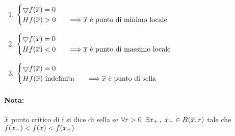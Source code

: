 \documentclass[12pt]{article}
\begin{document}
\begin{enumerate}
    \item $
              \begin{cases}
                  \bigtriangledown f(\overline{x}) = 0                                             \\
                  Hf(\overline{x}) > 0 & \quad\Longrightarrow \overline{x} \text{ è punto di minimo locale}
              \end{cases}
          $
    \item $
              \begin{cases}
                  \bigtriangledown f(\overline{x}) = 0                                              \\
                  Hf(\overline{x}) < 0 & \quad\Longrightarrow \overline{x} \text{ è punto di massimo locale}
              \end{cases}
          $
    \item $
              \begin{cases}
                  \bigtriangledown f(\overline{x}) = 0                                                    \\
                  Hf(\overline{x}) \text{ indefinita} & \quad\Longrightarrow \overline{x} \text{ è punto di sella}
              \end{cases}
          $
\end{enumerate}

\paragraph*{Nota:}
$\overline{x}$ punto critico di f si dice di sella se $\forall r > 0\;\; \exists x_+\,,\; x_- \in B(\overline{x}, r)$
tale che $f(x_-) < f(\overline{x}) < f(x_+)$
\end{document}
